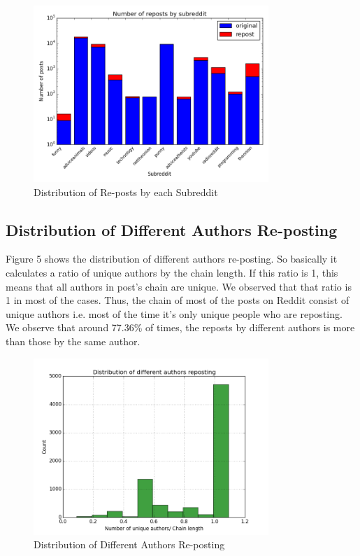 \documentclass{article} %
\begin{document}
\begin{figure}[h]
\begin{center}
\includegraphics[width=3.5in]{reposts.png}
\caption{Distribution of Re-posts by each Subreddit}
\end{center}
\end{figure}


\subsection{Distribution of Different Authors Re-posting}

Figure 5 shows the distribution of different authors re-posting. So basically it calculates a ratio of unique authors by the chain length. If this ratio is 1, this means that all authors in post's chain are unique. We observed that that ratio is 1 in most of the cases. Thus, the chain of most of the posts on Reddit consist of unique authors i.e. most of the time it's only unique people who are reposting. 
We observe that around  77.36\% of times, the reposts by different authors is more than those by the same author.

\begin{figure}[h]
\begin{center}
\includegraphics[width=3.5in]{unique_authors.png}
\caption{Distribution of Different Authors Re-posting}
\end{center}
\end{figure}
\end{document}
